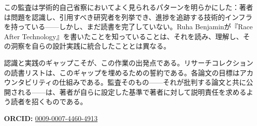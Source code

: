 \documentclass[10pt,letterpaper,twocolumn]{article}
\begin{document}
この監査は学術的自己省察においてよく見られるパターンを明らかにした：著者は問題を認識し、引用すべき研究者を列挙でき、進捗を追跡する技術的インフラを持っている——しかし、まだ読書を完了していない。Ruha Benjaminが『Race After Technology』を書いたことを知っていることは、それを読み、理解し、その洞察を自らの設計実践に統合したこととは異なる。

認識と実践のギャップこそが、この作業の出発点である。リサーチコレクションの読書リストは、このギャップを埋めるための誓約である。各論文の目標はアカウンタビリティの仕組みである。監査そのもの——それが批判する論文と共に公開される——は、著者が自らに設定した基準で著者に対して説明責任を求めるよう読者を招くものである。

\vspace{0.5em}
\noindent\textbf{ORCID:} \href{https://orcid.org/0009-0007-4460-4913}{0009-0007-4460-4913}




\end{document}
